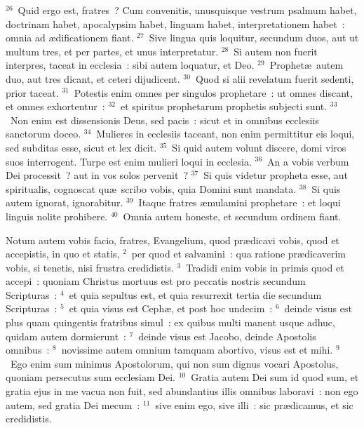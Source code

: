 ${}^{26}$~Quid ergo est, fratres~? Cum convenitis, unusquisque vestrum psalmum habet, doctrinam habet, apocalypsim habet, linguam habet, interpretationem habet~: omnia ad \ae dificationem fiant.
${}^{27}$~Sive lingua quis loquitur, secundum duos, aut ut multum tres, et per partes, et unus interpretatur.
${}^{28}$~Si autem non fuerit interpres, taceat in ecclesia~: sibi autem loquatur, et Deo.
${}^{29}$~Prophet\ae\ autem duo, aut tres dicant, et ceteri dijudicent.
${}^{30}$~Quod si alii revelatum fuerit sedenti, prior taceat.
${}^{31}$~Potestis enim omnes per singulos prophetare~: ut omnes discant, et omnes exhortentur~:
${}^{32}$~et spiritus prophetarum prophetis subjecti sunt.
${}^{33}$~Non enim est dissensionis Deus, sed pacis~: sicut et in omnibus ecclesiis sanctorum doceo.
${}^{34}$~Mulieres in ecclesiis taceant, non enim permittitur eis loqui, sed subditas esse, sicut et lex dicit.
${}^{35}$~Si quid autem volunt discere, domi viros suos interrogent. Turpe est enim mulieri loqui in ecclesia.
${}^{36}$~An a vobis verbum Dei processit~? aut in vos solos pervenit~?
${}^{37}$~Si quis videtur propheta esse, aut spiritualis, cognoscat qu\ae\ scribo vobis, quia Domini sunt mandata.
${}^{38}$~Si quis autem ignorat, ignorabitur.
${}^{39}$~Itaque fratres \ae mulamini prophetare~: et loqui linguis nolite prohibere.
${}^{40}$~Omnia autem honeste, et secundum ordinem fiant.

\lettrine[lines=3,image=true,loversize=0.05,lraise=-0.03]{N}{}otum autem vobis facio, fratres, Evangelium, quod pr\ae dicavi vobis, quod et accepistis, in quo et statis,
${}^{2}$~per quod et salvamini~: qua ratione pr\ae dicaverim vobis, si tenetis, nisi frustra credidistis.
${}^{3}$~Tradidi enim vobis in primis quod et accepi~: quoniam Christus mortuus est pro peccatis nostris secundum Scripturas~:
${}^{4}$~et quia sepultus est, et quia resurrexit tertia die secundum Scripturas~:
${}^{5}$~et quia visus est Ceph\ae , et post hoc undecim~:
${}^{6}$~deinde visus est plus quam quingentis fratribus simul~: ex quibus multi manent usque adhuc, quidam autem dormierunt~:
${}^{7}$~deinde visus est Jacobo, deinde Apostolis omnibus~:
${}^{8}$~novissime autem omnium tamquam abortivo, visus est et mihi.
${}^{9}$~Ego enim sum minimus Apostolorum, qui non sum dignus vocari Apostolus, quoniam persecutus sum ecclesiam Dei.
${}^{10}$~Gratia autem Dei sum id quod sum, et gratia ejus in me vacua non fuit, sed abundantius illis omnibus laboravi~: non ego autem, sed gratia Dei mecum~:
${}^{11}$~sive enim ego, sive illi~: sic pr\ae dicamus, et sic credidistis.


